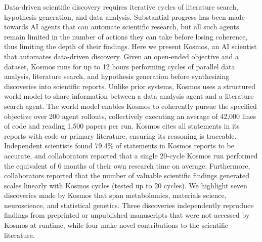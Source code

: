 \documentclass{article}
\newenvironment{headerbox}{
  \begin{tcolorbox}[
    colback=edisongray,      %
    colframe=edisongray,     %
    frame hidden,           %
    arc=4mm,                %
    boxrule=0pt,            %
    boxsep=0pt,             %
    left=15pt, right=15pt, top=10pt, bottom=15pt,
    nobeforeafter
  ]
}{
  \end{tcolorbox}
}
\begin{document}
\begin{center}
\begin{headerbox}
    Data-driven scientific discovery requires iterative cycles of literature search, hypothesis generation, and data analysis. Substantial progress has been made towards AI agents that can automate scientific research, but all such agents remain limited in the number of actions they can take before losing coherence, thus limiting the depth of their findings. Here we present Kosmos, an AI scientist that automates data-driven discovery. Given an open-ended objective and a dataset, Kosmos runs for up to 12 hours performing cycles of parallel data analysis, literature search, and hypothesis generation before synthesizing discoveries into scientific reports. Unlike prior systems, Kosmos uses a structured world model to share information between a data analysis agent and a literature search agent. The world model enables Kosmos to coherently pursue the specified objective over 200 agent rollouts, collectively executing an average of 42,000 lines of code and reading 1,500 papers per run. Kosmos cites all statements in its reports with code or primary literature, ensuring its reasoning is traceable. Independent scientists found 79.4\% of statements in Kosmos reports to be accurate, and collaborators reported that a single 20-cycle Kosmos run performed the equivalent of 6 months of their own research time on average. Furthermore, collaborators reported that the number of valuable scientific findings generated scales linearly with Kosmos cycles (tested up to 20 cycles). We highlight seven discoveries made by Kosmos that span metabolomics, materials science, neuroscience, and statistical genetics. Three discoveries independently reproduce findings from preprinted or unpublished manuscripts that were not accessed by Kosmos at runtime, while four make novel contributions to the scientific literature.
    \vspace{1em} %
    

\end{headerbox}
\end{center}
\end{document}

